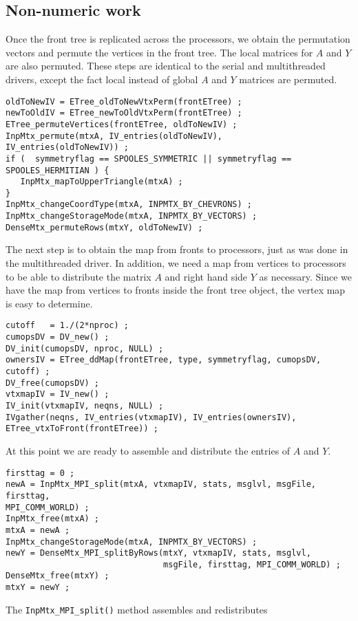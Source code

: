 \subsection{Non-numeric work}
\label{subsection:MPI:non-numeric}
\par
Once the front tree is replicated across the processors, we obtain
the permutation vectors and permute the vertices in the front tree.
The local matrices for $A$ and $Y$ are also permuted.
These steps are identical to the serial and multithreaded drivers,
except the fact local instead of global $A$ and $Y$ matrices 
are permuted.
\begin{verbatim}
oldToNewIV = ETree_oldToNewVtxPerm(frontETree) ;
newToOldIV = ETree_newToOldVtxPerm(frontETree) ;
ETree_permuteVertices(frontETree, oldToNewIV) ;
InpMtx_permute(mtxA, IV_entries(oldToNewIV),
IV_entries(oldToNewIV)) ;
if (  symmetryflag == SPOOLES_SYMMETRIC || symmetryflag == SPOOLES_HERMITIAN ) {
   InpMtx_mapToUpperTriangle(mtxA) ;
}
InpMtx_changeCoordType(mtxA, INPMTX_BY_CHEVRONS) ;
InpMtx_changeStorageMode(mtxA, INPMTX_BY_VECTORS) ;
DenseMtx_permuteRows(mtxY, oldToNewIV) ;
\end{verbatim}
\par
The next step is to obtain the map from fronts to processors,
just as was done in the multithreaded driver.
In addition, we need a map from vertices to processors to be able
to distribute the matrix $A$ and right hand side $Y$ as necessary.
Since we have the map from vertices to fronts inside the front tree
object, the vertex map is easy to determine.
\begin{verbatim}
cutoff   = 1./(2*nproc) ;
cumopsDV = DV_new() ;
DV_init(cumopsDV, nproc, NULL) ;
ownersIV = ETree_ddMap(frontETree, type, symmetryflag, cumopsDV, cutoff) ;
DV_free(cumopsDV) ;
vtxmapIV = IV_new() ;
IV_init(vtxmapIV, neqns, NULL) ;
IVgather(neqns, IV_entries(vtxmapIV), IV_entries(ownersIV), ETree_vtxToFront(frontETree)) ;
\end{verbatim}
At this point we are ready to assemble and distribute the entries
of $A$ and $Y$.
\begin{verbatim}
firsttag = 0 ;
newA = InpMtx_MPI_split(mtxA, vtxmapIV, stats, msglvl, msgFile, firsttag,
MPI_COMM_WORLD) ;
InpMtx_free(mtxA) ;
mtxA = newA ;
InpMtx_changeStorageMode(mtxA, INPMTX_BY_VECTORS) ;
newY = DenseMtx_MPI_splitByRows(mtxY, vtxmapIV, stats, msglvl, 
                                msgFile, firsttag, MPI_COMM_WORLD) ;
DenseMtx_free(mtxY) ;
mtxY = newY ;
\end{verbatim}
The {\tt InpMtx\_MPI\_split()} method assembles and redistributes
